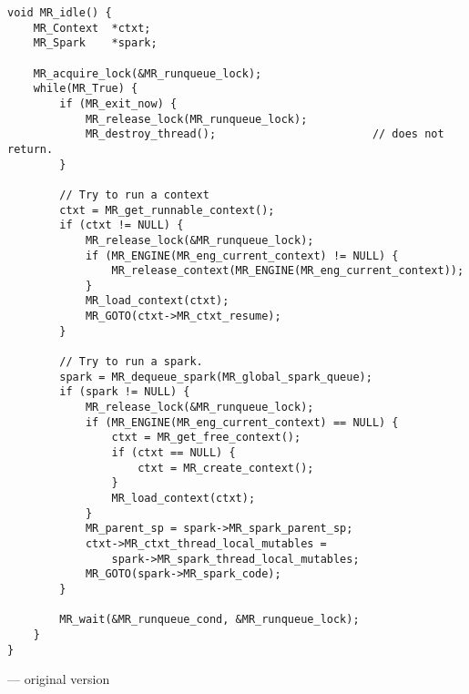 \begin{algorithm}[tbp]
\begin{verbatim}
void MR_idle() {
    MR_Context  *ctxt;
    MR_Spark    *spark;
    
    MR_acquire_lock(&MR_runqueue_lock);
    while(MR_True) {
        if (MR_exit_now) {
            MR_release_lock(MR_runqueue_lock);
            MR_destroy_thread();                        // does not return.
        }

        // Try to run a context
        ctxt = MR_get_runnable_context();
        if (ctxt != NULL) { 
            MR_release_lock(&MR_runqueue_lock);
            if (MR_ENGINE(MR_eng_current_context) != NULL) {
                MR_release_context(MR_ENGINE(MR_eng_current_context));
            }
            MR_load_context(ctxt);
            MR_GOTO(ctxt->MR_ctxt_resume);
        }
    
        // Try to run a spark.
        spark = MR_dequeue_spark(MR_global_spark_queue);
        if (spark != NULL) {
            MR_release_lock(&MR_runqueue_lock);
            if (MR_ENGINE(MR_eng_current_context) == NULL) {
                ctxt = MR_get_free_context();
                if (ctxt == NULL) {
                    ctxt = MR_create_context();
                }
                MR_load_context(ctxt);
            }
            MR_parent_sp = spark->MR_spark_parent_sp;
            ctxt->MR_ctxt_thread_local_mutables =
                spark->MR_spark_thread_local_mutables;
            MR_GOTO(spark->MR_spark_code);
        }

        MR_wait(&MR_runqueue_cond, &MR_runqueue_lock);
    }
}
\end{verbatim}
\caption{\idle --- original version}
\label{alg:MR_idle_initial}
\end{algorithm}

